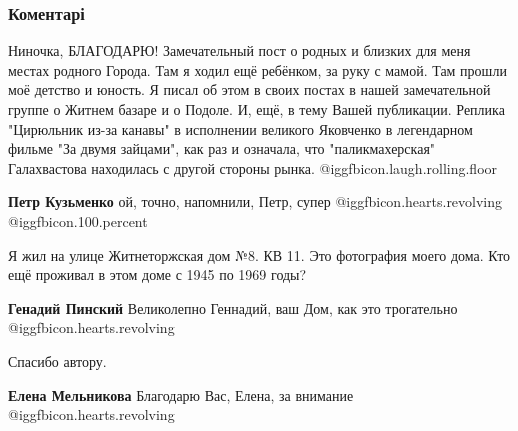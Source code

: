  
 
 
 
 
\subsubsection{Коментарі}
\label{sec:04_11_2021.fb.fb_group.story_kiev_ua.3.zhiznetorzhskaja_ploschad_podol.cmt}

\begin{itemize} %

Ниночка, БЛАГОДАРЮ! Замечательный пост о родных и близких для меня местах
родного Города. Там я ходил ещё ребёнком, за руку с мамой. Там прошли моё
детство и юность. Я писал об этом в своих постах в нашей замечательной группе о
Житнем базаре и о Подоле. И, ещё, в тему Вашей публикации. Реплика "Цирюльник
из-за канавы" в исполнении великого Яковченко в легендарном фильме "За двумя
зайцами", как раз и означала, что "паликмахерская" Галахвастова находилась с
другой стороны рынка.  @igg{fbicon.laugh.rolling.floor} 

\begin{itemize} %
\textbf{Петр Кузьменко} ой, точно, напомнили, Петр, супер @igg{fbicon.hearts.revolving}  @igg{fbicon.100.percent} 
\end{itemize} %


Я жил на улице Житнеторжская дом №8. КВ 11. Это фотография моего дома. Кто ещё
проживал в этом доме с 1945 по 1969 годы?

\begin{itemize} %
\textbf{Генадий Пинский} Великолепно Геннадий, ваш Дом, как это трогательно @igg{fbicon.hearts.revolving} 
\end{itemize} %

Спасибо автору.

\begin{itemize} %
\textbf{Елена Мельникова} Благодарю Вас, Елена, за внимание @igg{fbicon.hearts.revolving} 
\end{itemize} %


\end{itemize}
